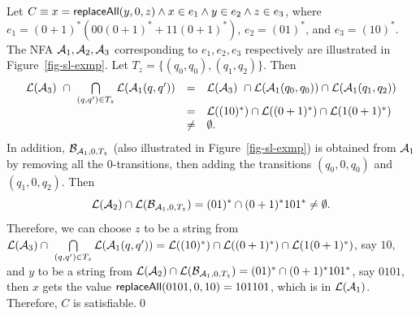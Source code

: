 \begin{example}\label{exmp-sl}
Let $C \equiv x= \mathsf{replaceAll}(y, 0, z) \wedge x \in e_1 \wedge y \in e_2 \wedge z \in e_3$, where $e_1=(0+1)^* (00(0+1)^* + 11(0+1)^*)$,  $e_2= (01)^*$,  and $e_3 = (10)^*$. The NFA $\mathcal{A}_{1}, \mathcal{A}_{2}, \mathcal{A}_{3}$ corresponding to $e_1, e_2, e_3$ respectively are illustrated in Figure~\ref{fig-sl-exmp}. Let $T_z = \{(q_0, q_0), (q_1, q_2)\}$.  Then
$$
\begin{array}{l c l}
 \mathcal{L}(\mathcal{A}_3)\ \cap\ \bigcap \limits_{(q, q') \in T_z} \mathcal{L}(\mathcal{A}_1(q, q'))  & = & \mathcal{L}(\mathcal{A}_3)\ \cap \mathcal{L}(\mathcal{A}_1(q_0, q_0)) \cap \mathcal{L}(\mathcal{A}_1(q_1,q_2)) \\
& = & \mathcal{L}((10)^*) \cap \mathcal{L}((0+1)^*) \cap \mathcal{L}(1(0+1)^*) \\
& \neq & \emptyset.
\end{array}
$$
In addition, $\mathcal{B}_{\mathcal{A}_1, 0, T_z}$ (also illustrated in Figure~\ref{fig-sl-exmp}) is obtained from $\mathcal{A}_1$ by removing all the $0$-transitions, then adding the transitions $(q_0, 0, q_0)$ and $(q_1, 0, q_2)$. Then
$$
 \mathcal{L}(\mathcal{A}_2) \cap \mathcal{L}(\mathcal{B}_{\mathcal{A}_1,0,T_z})   =  (01)^* \cap (0+1)^* 10 1^* \neq \emptyset.
$$
Therefore, we can choose $z$ to be a string from $\mathcal{L}(\mathcal{A}_3) \cap \ \bigcap \limits_{(q, q') \in T_z} \mathcal{L}(\mathcal{A}_1(q, q'))=\mathcal{L}((10)^*) \cap \mathcal{L}((0+1)^*) \cap \mathcal{L}(1(0+1)^*)$, say $10$, and $y$ to be a string from $ \mathcal{L}(\mathcal{A}_2) \cap \mathcal{L}(\mathcal{B}_{\mathcal{A}_1,0,T_z})   =  (01)^* \cap (0+1)^* 10 1^*$, say $0101$,  then $x$ gets the value $\mathsf{replaceAll}(0101, 0, 10)=101101$, which is in $\mathcal{L}(\mathcal{A}_1)$. Therefore, $C$ is satisfiable.\qed
%
\begin{figure}[htbp]
\begin{center}

\end{center}
\end{figure}
\end{example}
